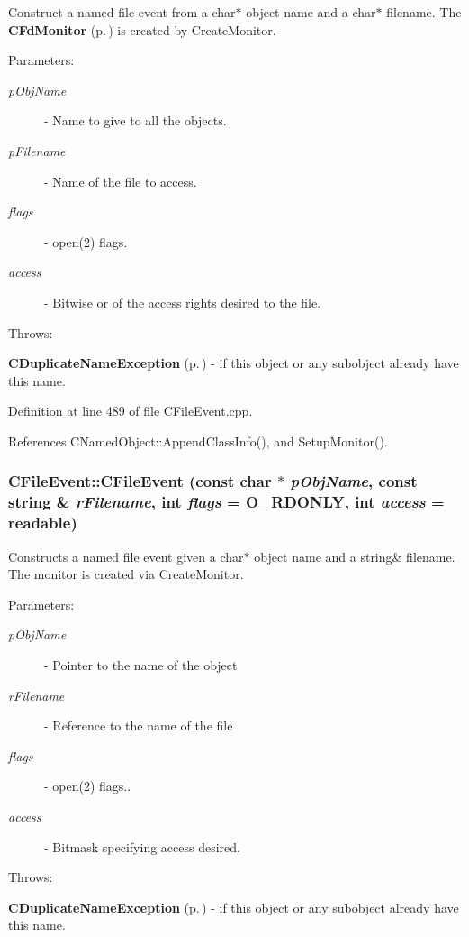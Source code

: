 Construct a named file event from a char$\ast$ object name and a char$\ast$ filename. The {\bf CFd\-Monitor} {\rm (p.\,\pageref{classCFdMonitor})} is created by Create\-Monitor. \begin{Desc}
\item[Parameters: ]\par
\begin{description}
\item[{\em 
p\-Obj\-Name}]- Name to give to all the objects. \item[{\em 
p\-Filename}]- Name of the file to access. \item[{\em 
flags}]- open(2) flags. \item[{\em 
access}]- Bitwise or of the access rights desired to the file.\end{description}
\end{Desc}
Throws:\begin{CompactItemize}
\item 
{\bf CDuplicate\-Name\-Exception} {\rm (p.\,\pageref{classCDuplicateNameException})} - if this object or any subobject already have this name. \end{CompactItemize}


Definition at line 489 of file CFile\-Event.cpp.

References CNamed\-Object::Append\-Class\-Info(), and Setup\-Monitor().
\subsubsection{\setlength{\rightskip}{0pt plus 5cm}CFile\-Event::CFile\-Event (const char $\ast$ {\em p\-Obj\-Name}, const string \& {\em r\-Filename}, int {\em flags} = O\_\-RDONLY, int {\em access} = {\bf readable})}\label{classCFileEvent_a5}


Constructs a named file event given a char$\ast$ object name and a string\& filename. The monitor is created via Create\-Monitor. \begin{Desc}
\item[Parameters: ]\par
\begin{description}
\item[{\em 
p\-Obj\-Name}]- Pointer to the name of the object  \item[{\em 
r\-Filename}]- Reference to the name of the file \item[{\em 
flags}]- open(2) flags.. \item[{\em 
access}]- Bitmask specifying access desired.\end{description}
\end{Desc}
Throws:\begin{CompactItemize}
\item 
{\bf CDuplicate\-Name\-Exception} {\rm (p.\,\pageref{classCDuplicateNameException})} - if this object or any subobject already have this name. \end{CompactItemize}


